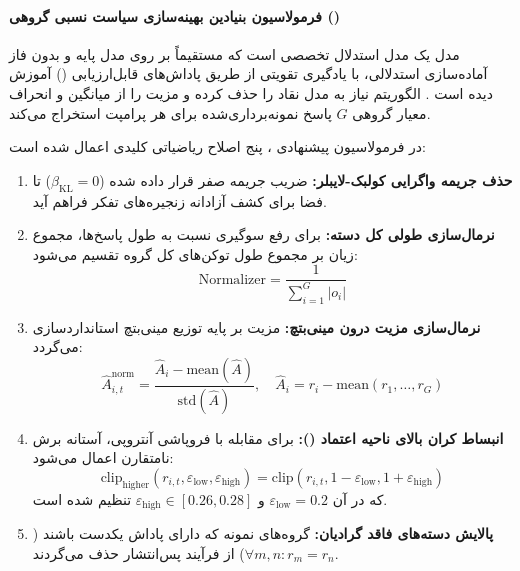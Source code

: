 \item {}

\paragraph*{فرمولاسیون بنیادین بهینه‌سازی سیاست نسبی گروهی ()}
مدل  یک مدل استدلال تخصصی است که مستقیماً بر روی مدل پایه و بدون فاز آماده‌سازی  استدلالی، با یادگیری تقویتی از طریق پاداش‌های قابل‌ارزیابی () آموزش دیده است \cite{magistral2025}. الگوریتم  \cite{shao2024deepseekmath} نیاز به مدل نقاد را حذف کرده و مزیت را از میانگین و انحراف معیار گروهی $G$ پاسخ نمونه‌برداری‌شده برای هر پرامپت استخراج می‌کند. 

در فرمولاسیون پیشنهادی ، پنج اصلاح ریاضیاتی کلیدی اعمال شده است:
\begin{enumerate}
    \item \textbf{حذف جریمه واگرایی کولبک-لایبلر:} ضریب جریمه صفر قرار داده شده ($\beta_{\text{KL}} = 0$) تا فضا برای کشف آزادانه زنجیره‌های تفکر فراهم آید.
    \item \textbf{نرمال‌سازی طولی کل دسته:} برای رفع سوگیری نسبت به طول پاسخ‌ها، مجموع زیان بر مجموع طول توکن‌های کل گروه تقسیم می‌شود:
    \begin{equation}
        \text{Normalizer} = \frac{1}{\sum_{i=1}^G |o_i|}
    \end{equation}
    \item \textbf{نرمال‌سازی مزیت درون مینی‌بتچ:} مزیت بر پایه توزیع مینی‌بتچ استانداردسازی می‌گردد:
    \begin{equation}
        \hat{A}_{i,t}^{\text{norm}} = \frac{\hat{A}_i - \text{mean}(\hat{A})}{\text{std}(\hat{A})}, \quad \hat{A}_i = r_i - \text{mean}(r_1, \dots, r_G)
    \end{equation}
    \item \textbf{انبساط کران بالای ناحیه اعتماد ():} برای مقابله با فروپاشی آنتروپی، آستانه برش نامتقارن اعمال می‌شود:
    \begin{equation}
        \text{clip}_{\text{higher}}(r_{i,t}, \varepsilon_{\text{low}}, \varepsilon_{\text{high}}) = \text{clip}(r_{i,t}, 1 - \varepsilon_{\text{low}}, 1 + \varepsilon_{\text{high}})
    \end{equation}
    که در آن $\varepsilon_{\text{low}} = 0.2$ و $\varepsilon_{\text{high}} \in [0.26, 0.28]$ تنظیم شده است.
    \item \textbf{پالایش دسته‌های فاقد گرادیان:} گروه‌های نمونه که دارای پاداش یکدست باشند ($\forall m, n: r_m = r_n$) از فرآیند پس‌انتشار حذف می‌گردند.
\end{enumerate}

